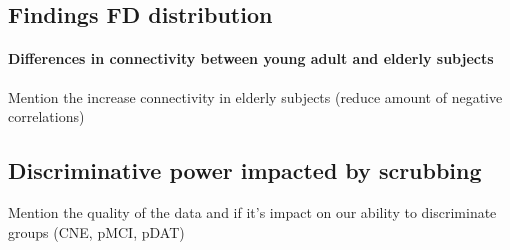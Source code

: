 \documentclass[authoryear,preprint,review]{elsarticle}
\begin{document}
\subsection{Findings FD distribution}

\paragraph{Differences in connectivity between young adult and elderly subjects}
Mention the increase connectivity in elderly subjects (reduce amount of negative correlations)


\subsection{Discriminative power impacted by scrubbing}
Mention the quality of the data and if it's impact on our ability to discriminate groups (CNE, pMCI, pDAT)
\end{document}
